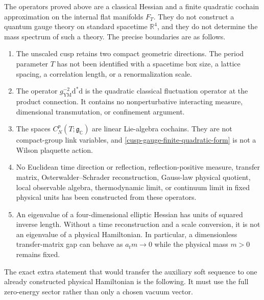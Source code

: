 The operators proved above are a classical Hessian and a finite quadratic
cochain approximation on the internal flat manifolds \(F_T\).  They do not
construct a quantum gauge theory on standard spacetime \(\mathbb R^4\), and
they do not determine the mass spectrum of such a theory.  The precise
boundaries are as follows.
\begin{enumerate}[label=(\arabic*)]
\item The unscaled cusp retains two compact geometric directions.  The
period parameter \(T\) has not been identified with a spacetime box size,
a lattice spacing, a correlation length, or a renormalization scale.
\item The operator \(g_{\mathrm{YM}}^{-2}\mathrm d^*\mathrm d\) is the
quadratic classical fluctuation operator at the product connection.  It
contains no nonperturbative interacting measure, dimensional
transmutation, or confinement argument.
\item The spaces \(C_N^p(T;\mathfrak g_{\mathbb C})\) are linear
Lie-algebra cochains.  They are not compact-group link variables, and
\cref{cusp-gauge-finite-quadratic-form} is not a Wilson plaquette action.
\item No Euclidean time direction or reflection, reflection-positive
measure, transfer matrix, Osterwalder--Schrader reconstruction, Gauss-law
physical quotient, local observable algebra, thermodynamic limit, or
continuum limit in fixed physical units has been constructed from these
operators.
\item An eigenvalue of a four-dimensional elliptic Hessian has units of
squared inverse length.  Without a time reconstruction and a scale
conversion, it is not an eigenvalue of a physical Hamiltonian.  In
particular, a dimensionless transfer-matrix gap can behave as
\(a_tm\to0\) while the physical mass \(m>0\) remains fixed.
\end{enumerate}

The exact extra statement that would transfer the auxiliary soft sequence
to one already constructed physical Hamiltonian is the following.  It
must use the full zero-energy sector rather than only a chosen vacuum
vector.

